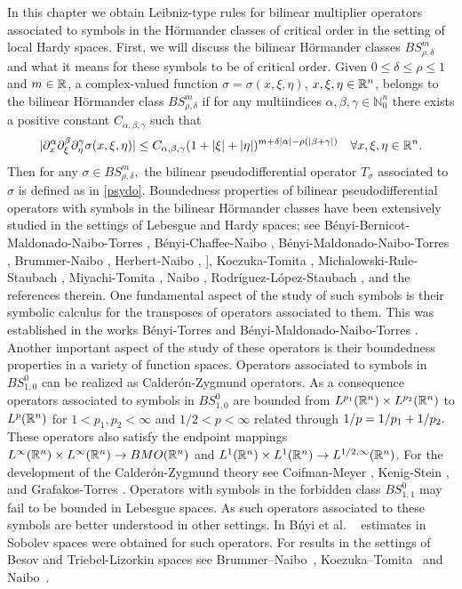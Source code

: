 In this chapter we obtain Leibniz-type rules for bilinear multiplier operators associated to symbols in the H\"ormander classes of critical order in the setting of local Hardy spaces. First, we will discuss the bilinear H\"ormander classes $BS^m_{\rho,\delta}$ and what it means for these symbols to be of critical order. Given $0\leq \delta \leq \rho \leq 1$ and $m\in\mathbb{R}$, a complex-valued function $\sigma = \sigma(x,\xi,\eta)$, $x,\xi,\eta \in {{\mathbb R}^n}$, belongs to the bilinear H\"ormander class $BS^m_{\rho,\delta}$ if for any multiindices $\alpha,\beta,\gamma \in \mathbb{N}^n_0$ there exists a positive constant $C_{\alpha,\beta,\gamma}$ such that 
\begin{equation}\label{def:Bmrd}
|\partial_x^\alpha \partial_\xi^\beta \partial_\eta^\gamma \sigma(x, \xi, \eta)| \leq C_{\alpha, \beta, \gamma} (1+|\xi|+|\eta|)^{m +\delta \left\vert \alpha \right\vert-\rho(\left\vert \beta+\gamma \right\vert)} \quad \forall x, \xi, \eta \in {{\mathbb R}^n}.
\end{equation}
Then for any $\sigma \in BS^m_{\rho,\delta},$ the bilinear pseudodifferential operator $T_\sigma$ associated to $\sigma$ is defined as in \ref{psydo}. Boundedness properties of bilinear pseudodifferential operators with symbols
in the bilinear H\"ormander classes have been extensively studied in the settings of
Lebesgue and Hardy spaces; see B\'enyi-Bernicot-Maldonado-Naibo-Torres \citep{MR2660466}, B\'enyi-Chaffee-Naibo \citep{benyi2018strongly}, B\'enyi-Maldonado-Naibo-Torres \citep{MR1986065, MR2660466}, Brummer-Naibo \citep{MR3750234}, Herbert-Naibo \citep{MR3627725}, \citep{MR3211086}], Koezuka-Tomita \citep{MR3750316}, Michalowski-Rule-Staubach \citep{MR3165300}, Miyachi-Tomita
\citep{MR3179688, miyachi2018bilinear, miyachi2018bilinear2}, Naibo \cite{MR3393696, MR3411149}, Rodr\'iguez-L\'opez-Staubach \citep{MR3035059}, and the references therein. One fundamental aspect of the study of such symbols is their symbolic calculus for the transposes of operators associated to them. This was established in the works B\'enyi-Torres \citep{MR1986065} and B\'enyi-Maldonado-Naibo-Torres \citep{MR2660466}. Another important aspect of the study of these operators is their boundedness properties in a variety of function spaces. Operators associated to symbols in $BS^0_{1,0}$ can be realized as Calder\'on-Zygmund operators. As a consequence operators associated to symbols in $BS^0_{1,0}$ are bounded from $L^{p_1}({{\mathbb R}^n}) \times L^{p_2}({{\mathbb R}^n})$ to  $L^p({{\mathbb R}^n})$ for  $1 < p_1, p_2 < \infty$ and $1/2<p <\infty$ related through $1/p=1/p_1+1/p_2.$ These operators also satisfy the endpoint mappings $L^\infty({{\mathbb R}^n}) \times L^\infty({{\mathbb R}^n}) \rightarrow BMO({{\mathbb R}^n})$ and $L^1({{\mathbb R}^n}) \times L^1({{\mathbb R}^n}) \rightarrow L^{1/2, \infty}({{\mathbb R}^n})$. For the development of the Calder\'on-Zygmund theory see Coifman-Meyer \citep{MR518170}, Kenig-Stein \citep{MR1713146}, and Grafakos-Torres \citep{MR1880324}. Operators with symbols in the forbidden class $BS^0_{1,1}$ may fail to be bounded in Lebesgue spaces. As such operators associated to these symbols are better understood in other settings. In B\'nyi et al. ~\cite{MR1996120, MR2250054, MR1986065} estimates in Sobolev spaces were obtained for such operators. For results in the settings of Besov and Triebel-Lizorkin spaces see Brummer--Naibo~\cite{MR3750234}, Koezuka--Tomita~\cite{MR3750316} and Naibo~\cite{MR3393696}.



